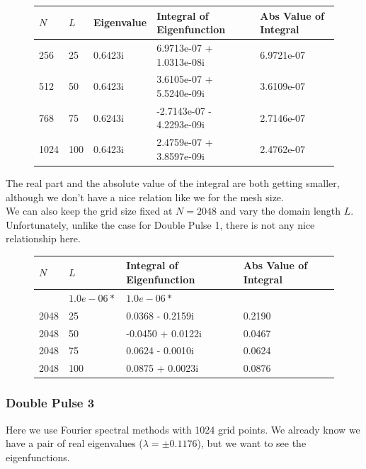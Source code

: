 \documentclass[12pt]{article}
\begin{document}
\begin{figure}[H]
\begin{tabular}{l|llll}  
  $N$  & $L$    &  Eigenvalue &  Integral of Eigenfunction  & Abs Value of Integral   \\ \hline
  256  &  25    &   0.6423i   &  6.9713e-07 + 1.0313e-08i & 6.9721e-07 \\ 
  512  &  50    &   0.6423i   &  3.6105e-07 + 5.5240e-09i & 3.6109e-07 \\ 
  768  &  75    &   0.6243i   & -2.7143e-07 - 4.2293e-09i & 2.7146e-07 \\
  1024 &  100   &   0.6423i   &  2.4759e-07 + 3.8597e-09i & 2.4762e-07 \\
\end{tabular}
\end{figure}
The real part and the absolute value of the integral are both getting smaller, although we don't have a nice relation like we for the mesh size. \\

We can also keep the grid size fixed at $N = 2048$ and vary the domain length $L$. Unfortunately, unlike the case for Double Pulse 1, there is not any nice relationship here.

\begin{figure}[H]
\begin{tabular}{l|lll}
  $N$   &  $L$ & Integral of Eigenfunction & Abs Value of Integral \\ \hline
        &   $1.0e-06 *$         & $1.0e-06 *$ \\
  2048  & 25    &   0.0368 - 0.2159i &   0.2190 \\ 
  2048  & 50    &  -0.0450 + 0.0122i &   0.0467 \\ 
  2048  & 75    &   0.0624 - 0.0010i &   0.0624 \\
  2048  & 100   &   0.0875 + 0.0023i &   0.0876 \\
\end{tabular}
\end{figure}


\subsubsection*{Double Pulse 3}
Here we use Fourier spectral methods with 1024 grid points. We already know we have a pair of real eigenvalues ($\lambda = \pm 0.1176$), but we want to see the eigenfunctions.
\end{document}
